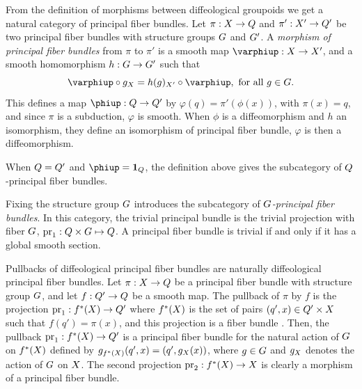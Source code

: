 \begin{article}
  \label{Category-of-principal-fiber-bundles}
  From the definition of morphisms between diffeological groupoids  we get a natural category of principal fiber bundles.
  Let $\pi : X \to Q$ and $\pi' : X' \to Q'$ be two principal fiber bundles with structure groups $G$ and $G'$.
  A {\em morphism of principal fiber bundles} from $\pi$ to $\pi'$ is a smooth map $ \phi : \X \to \X'$,
  and a smooth homomorphism $h : G \to G'$ such that
  $$%
  \phi \circ g_\X = h(g)_{\X'} \circ \phi, \text{ for all } g \in \G.
  $$%
  This defines a map $\varphi : \Q \to \Q'$ by $\varphi(q) = \pi'(\phi(x))$,
  with $\pi(x) = q$,
  and since $\pi$ is a subduction, $\varphi$ is smooth.
  When $\phi$ is a diffeomorphism and $h$ an isomorphism,
  they define an isomorphism of principal fiber bundle,
  $\varphi$ is then a diffeomorphism.
  
   When $Q = Q'$ and $\varphi = \id_\Q$,
  the definition above gives the subcategory of $Q$-principal fiber bundles.
  
   Fixing the structure group $G$ introduces the subcategory of {\em $G$-principal fiber bundles}.
  In this category,
  the trivial principal bundle is the trivial projection with fiber $G$,
  $\mathrm{pr}_1 : Q \times G \mapsto Q$.
  A principal fiber bundle is trivial if and only if it has a global smooth section.
  
   Pullbacks of diffeological principal fiber bundles are naturally diffeological principal fiber bundles.
  Let $\pi : X \to Q$ be a principal fiber bundle with structure group $G$,
  and let $f : Q' \to Q$ be a smooth map.
  The pullback of $\pi$ by $f$ is the projection $\mathrm{pr}_1 : f^*(X) \to Q'$ where $f^*(X)$ is the set of pairs $(q',x) \in Q' \times X$ such that $f(q') = \pi(x)$,
  and this projection is a fiber bundle .
  Then,
  the pullback $\mathrm{pr}_1 : f^*(X) \to Q'$ is a principal fiber bundle for the natural action of $G$ on $f^*(X)$ defined by $g_{f^*(X)}(q',x) = (q', g_X(x))$,
  where $g\in G$ and $g_X$ denotes the action of $G$ on $X$.
  The second projection $\mathrm{pr}_2 : f^*(X) \to X$ is clearly a morphism of a principal fiber bundle.
\end{article} %

